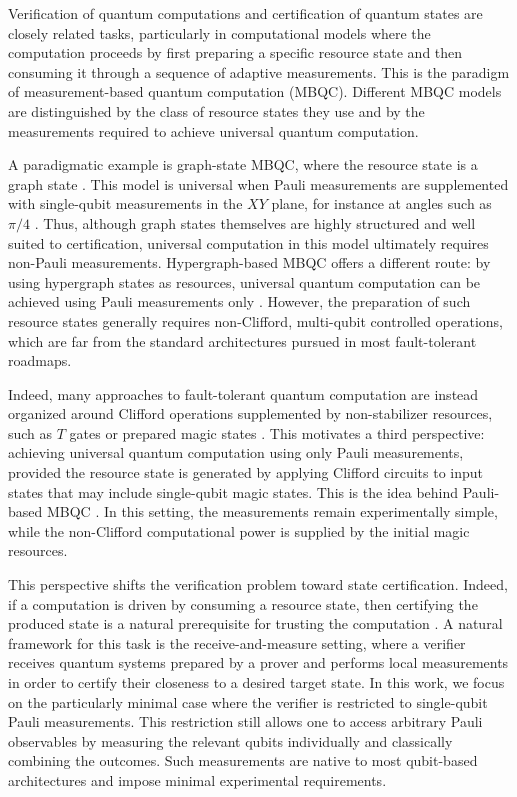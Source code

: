 \documentclass[a4paper,twocolumn,11pt,unpublished]{../../revision/quantumarticle}
\begin{document}
Verification of quantum computations and certification of quantum states are closely related tasks, particularly in computational models where the computation proceeds by first preparing a specific resource state and then consuming it through a sequence of adaptive measurements. This is the paradigm of measurement-based quantum computation (MBQC). Different MBQC models are distinguished by the class of resource states they use and by the measurements required to achieve universal quantum computation.

A paradigmatic example is graph-state MBQC, where the resource state is a graph state
\cite{RB01one}. This model is universal when Pauli measurements are supplemented with single-qubit measurements in the $XY$ plane, for instance at angles such as $\pi/4$ \cite{DKP07measurement}. Thus, although graph states themselves are highly structured and well suited to certification, universal computation in this model ultimately requires non-Pauli measurements. Hypergraph-based MBQC offers a different route: by using hypergraph states as resources, universal quantum computation can be achieved using Pauli measurements only \cite{TMH18quantum}. However, the preparation of such resource states generally requires non-Clifford, multi-qubit controlled operations, which are far from the standard architectures pursued in most fault-tolerant roadmaps.

Indeed, many approaches to fault-tolerant quantum computation are instead organized around Clifford operations supplemented by non-stabilizer resources, such as $T$ gates or prepared magic states
\cite{DBMA25breaking, G23cleaner, AAAA22suppressing, MGCM25ibm, GSJ24magic}.
This motivates a third perspective: achieving universal quantum computation using only Pauli measurements, provided the resource state is generated by applying Clifford circuits to input states that may include single-qubit magic states. This is the idea behind Pauli-based MBQC \cite{SDKO07direct}. In this setting, the measurements remain experimentally simple, while the non-Clifford computational power is supplied by the initial magic resources.

This perspective shifts the verification problem toward state certification. Indeed, if a computation is driven by consuming a resource state, then certifying the produced state is a natural prerequisite for trusting the computation \cite{FFS26}. A natural framework for this task is the receive-and-measure setting, where a verifier receives quantum systems prepared by a prover and performs local measurements in order to certify their closeness to a desired target state. In this work, we focus on the particularly minimal case where the verifier is restricted to single-qubit Pauli measurements. This restriction still allows one to access arbitrary Pauli observables by measuring the relevant qubits individually and classically combining the outcomes. Such measurements are native to most qubit-based architectures and impose minimal experimental requirements.
\end{document}
